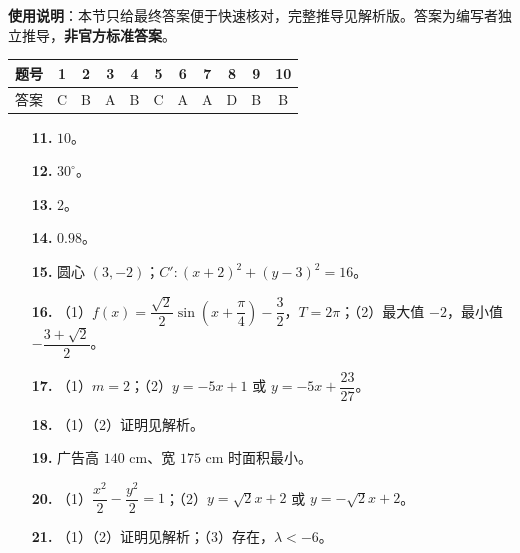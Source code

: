 
\begin{gknotice}
\textbf{使用说明}：本节只给最终答案便于快速核对，完整推导见解析版。答案为编写者独立推导，\textbf{非官方标准答案}。
\end{gknotice}

\begin{center}\begin{tabular}{ccccccccccc}
\toprule
题号 & 1 & 2 & 3 & 4 & 5 & 6 & 7 & 8 & 9 & 10 \\
\midrule
答案 & C & B & A & B & C & A & A & D & B & B \\
\bottomrule
\end{tabular}\end{center}

\begin{itemize}[leftmargin=2.6em]
  \item[\textbf{11.}] $10$。
  \item[\textbf{12.}] $30^\circ$。
  \item[\textbf{13.}] $2$。
  \item[\textbf{14.}] $0.98$。
  \item[\textbf{15.}] 圆心 $(3,-2)$；$C':(x+2)^2+(y-3)^2=16$。
\end{itemize}

\begin{itemize}[leftmargin=2.6em]
  \item[\textbf{16.}] （1）$f(x)=\dfrac{\sqrt2}2\sin\left(x+\dfrac{\pi}4\right)-\dfrac32$，$T=2\pi$；（2）最大值 $-2$，最小值 $-\dfrac{3+\sqrt2}2$。
  \item[\textbf{17.}] （1）$m=2$；（2）$y=-5x+1$ 或 $y=-5x+\dfrac{23}{27}$。
  \item[\textbf{18.}] （1）（2）证明见解析。
  \item[\textbf{19.}] 广告高 $140$ cm、宽 $175$ cm 时面积最小。
  \item[\textbf{20.}] （1）$\dfrac{x^2}2-\dfrac{y^2}2=1$；（2）$y=\sqrt2x+2$ 或 $y=-\sqrt2x+2$。
  \item[\textbf{21.}] （1）（2）证明见解析；（3）存在，$\lambda<-6$。
\end{itemize}
